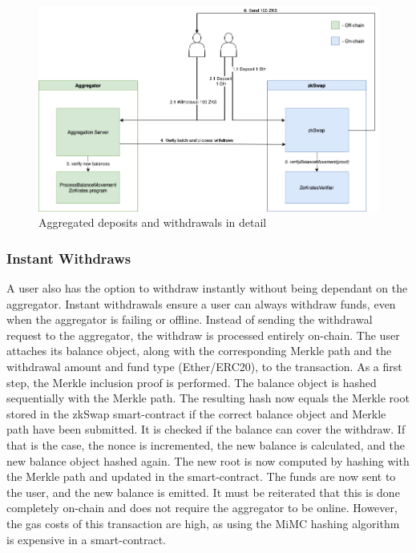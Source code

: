 \documentclass[../../thesis.tex]{subfiles}
\begin{document}
\begin{figure}[h]
    \centerline{\includegraphics[totalheight=8cm]{diagrams/depWithFlow.png}}
    \caption{Aggregated deposits and withdrawals in detail}
    \label{fig:depWithFlow}
\end{figure}

\subsubsection{Instant Withdraws}
A user also has the option to withdraw instantly without being dependant on the aggregator. Instant withdrawals ensure a user can always withdraw funds, even when the aggregator is failing or offline. Instead of sending the withdrawal request to the aggregator, the withdraw is processed entirely on-chain. The user attaches its balance object, along with the corresponding Merkle path and the withdrawal amount and fund type (Ether/ERC20), to the transaction. As a first step, the Merkle inclusion proof is performed. The balance object is hashed sequentially with the Merkle path. The resulting hash now equals the Merkle root stored in the zkSwap smart-contract if the correct balance object and Merkle path have been submitted. It is checked if the balance can cover the withdraw. If that is the case, the nonce is incremented, the new balance is calculated, and the new balance object hashed again. The new root is now computed by hashing with the Merkle path and updated in the smart-contract. The funds are now sent to the user, and the new balance is emitted. It must be reiterated that this is done completely on-chain and does not require the aggregator to be online. However, the gas costs of this transaction are high, as using the MiMC hashing algorithm is expensive in a smart-contract.
\end{document}
